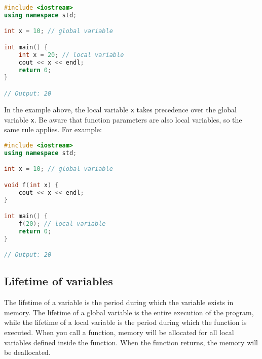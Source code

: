 \begin{lstlisting}[language=C++]
#include <iostream>
using namespace std;

int x = 10; // global variable

int main() {
    int x = 20; // local variable
    cout << x << endl;
    return 0;
}

// Output: 20
\end{lstlisting}

In the example above, the local variable \texttt{x} takes precedence over the global variable \texttt{x}. Be aware
that function parameters are also local variables, so the same rule applies. For example:\\

\begin{lstlisting}[language=C++]
#include <iostream>
using namespace std;

int x = 10; // global variable

void f(int x) {
    cout << x << endl;
}

int main() {
    f(20); // local variable
    return 0;
}

// Output: 20
\end{lstlisting}

\subsection{Lifetime of variables}

The lifetime of a variable is the period during which the variable exists in memory. The lifetime of a global variable
is the entire execution of the program, while the lifetime of a local variable is the period during which the function is
executed. When you call a function, memory will be allocated for all local variables defined inside the function. When the
function returns, the memory will be deallocated.\\